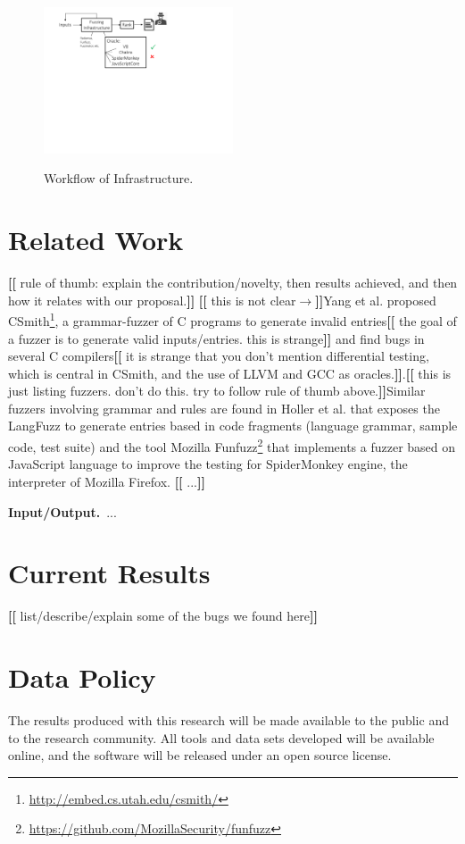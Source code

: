 \documentclass[11pt]{article}
\newcommand{\Fix}[1]{\textbf{[[}{\color{red} #1}\textbf{]]}}
\newcommand{\Mar}[1]{\textbf{[[}{\color{blue} #1}\textbf{]]}}
\begin{document}
\begin{figure}[htbp]
  \centering
  \includegraphics[trim=0 350 200 0,clip,width=0.5\textwidth]{google-awards-workflow}
  \label{fig:workflow}
  \caption{Workflow of Infrastructure.}
\end{figure}


\section{Related Work}

\Mar{rule of thumb: explain the
  contribution/novelty, then results achieved, and then how it relates
with our proposal.}
\Mar{this is not clear$\rightarrow$}Yang et al. \cite{yang-2011-finding} proposed CSmith\footnote{\url{http://embed.cs.utah.edu/csmith/}}, a grammar-fuzzer 
of C programs to generate invalid entries\Fix{the goal of a
  fuzzer is to generate valid inputs/entries. this is strange} and
find bugs in several C compilers\Fix{it is strange that you don't mention differential
  testing, which is central in CSmith, and the use of LLVM and GCC as
  oracles.}.\Mar{this is just listing fuzzers. don't do this. try to
  follow rule of thumb above.}Similar fuzzers involving grammar and rules are found in Holler et al. \cite{holler-2012-fuzzing} 
that exposes the LangFuzz to generate entries based in code fragments 
(language grammar, sample code, test suite) and the tool Mozilla 
Funfuzz\footnote{\url{https://github.com/MozillaSecurity/funfuzz}}
that implements a fuzzer based on JavaScript language to improve the 
testing for SpiderMonkey engine, the interpreter of Mozilla Firefox.
\Fix{...}



\vspace{1ex}\noindent\textbf{Input/Output.}~...

\section{Current Results}
\label{sec:results}

\Fix{list/describe/explain some of the bugs we found here}

\section{Data Policy}

The results produced with this research will be made available to the
public and to the research community.  All tools and data sets
developed will be available online, and the software will be released
under an open source license.


\footnotesize


\end{document}
